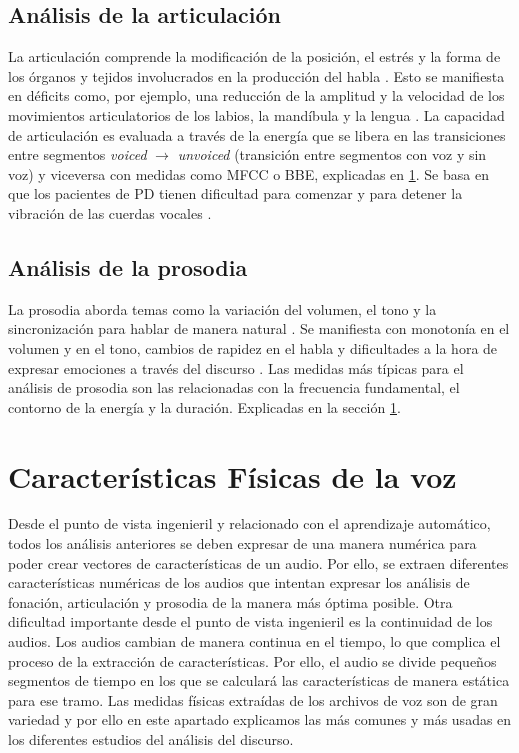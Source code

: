 \subsection{Análisis de la articulación}
La articulación comprende la modificación de la posición, el estrés y la forma de los órganos y tejidos involucrados en la producción del habla \cite{speechAnalysis}. Esto se manifiesta en déficits como, por ejemplo, una reducción de la amplitud y la velocidad de los movimientos articulatorios de los labios, la mandíbula y la lengua \cite{articulationfeat}. La capacidad de articulación es evaluada a través de la energía que se libera en las transiciones entre segmentos \textit{voiced} $\rightarrow$ \textit{unvoiced} (transición entre segmentos con voz y sin voz) y viceversa con medidas como MFCC o BBE, explicadas en \ref{sec:ccas}. Se basa en que los pacientes de PD tienen dificultad para comenzar y para detener la vibración de las cuerdas vocales \cite{neurospeech}.

\subsection{Análisis de la prosodia}
La prosodia aborda temas como la variación del volumen, el tono y la sincronización para hablar de manera natural \cite{speechAnalysis}. Se manifiesta con monotonía en el volumen y en el tono, cambios de rapidez en el habla y dificultades a la hora de expresar emociones a través del discurso \cite{emotionfeat}. Las medidas más típicas para el análisis de prosodia son las relacionadas con la frecuencia fundamental, el contorno de la energía y la duración. Explicadas en la sección \ref{sec:ccas}.

\section{Características Físicas de la voz} \label{sec:ccas}
Desde el punto de vista ingenieril y relacionado con el aprendizaje automático, todos los análisis anteriores se deben expresar de una manera numérica para poder crear vectores de características de un audio. Por ello, se extraen diferentes características numéricas de los audios que intentan expresar los análisis de fonación, articulación y prosodia de la manera más óptima posible. Otra dificultad importante desde el punto de vista ingenieril es la continuidad de los audios. Los audios cambian de manera continua en el tiempo, lo que complica el proceso de la extracción de características. Por ello, el audio se divide pequeños segmentos de tiempo en los que se calculará las características de manera estática para ese tramo. Las medidas físicas extraídas de los archivos de voz son de gran variedad y por ello en este apartado explicamos las más comunes y más usadas en los diferentes estudios del análisis del discurso. 

